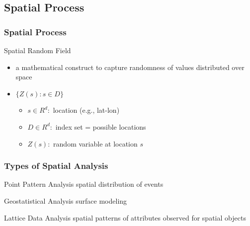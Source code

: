 \documentclass[nototal,handout]{beamer}
\begin{document}
\subsection{Spatial Process}
\begin{frame}
  \frametitle{Spatial Process}
  \begin{block}{Spatial Random Field}
    \begin{itemize}
      \item a mathematical construct to capture randomness of values
	distributed over space
      \item $ \{ Z(s):s \in D \} $
	\begin{itemize}
	  \item $s \in R^d:$ location (e.g., lat-lon)
	  \item $D \in R^d:$ index set = possible locations
	  \item $Z(s):$ random variable at location $s$
	\end{itemize}
    \end{itemize}
   \end{block}
 \end{frame}
 \begin{frame}
   \frametitle{Types of Spatial Analysis}
   \begin{block}{Point Pattern Analysis}
      spatial distribution of events
    \end{block}
   \begin{block}{Geostatistical Analysis}
      surface modeling
    \end{block}
   \begin{block}{Lattice Data Analysis}
     spatial patterns of attributes observed for spatial objects
    \end{block}
  \end{frame}
\end{document}
